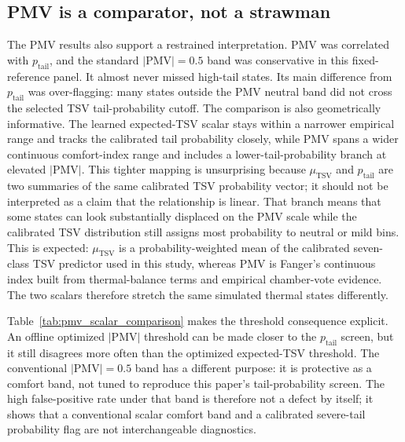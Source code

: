 \subsection{PMV is a comparator, not a strawman}

The PMV results also support a restrained interpretation. PMV was correlated with $p_{\mathrm{tail}}$, and the standard $|\mathrm{PMV}|=0.5$ band was conservative in this fixed-reference panel. It almost never missed high-tail states. Its main difference from $p_{\mathrm{tail}}$ was over-flagging: many states outside the PMV neutral band did not cross the selected TSV tail-probability cutoff. The comparison is also geometrically informative. The learned expected-TSV scalar stays within a narrower empirical range and tracks the calibrated tail probability closely, while PMV spans a wider continuous comfort-index range and includes a lower-tail-probability branch at elevated $|\mathrm{PMV}|$. This tighter mapping is unsurprising because $\mu_{\mathrm{TSV}}$ and $p_{\mathrm{tail}}$ are two summaries of the same calibrated TSV probability vector; it should not be interpreted as a claim that the relationship is linear. That branch means that some states can look substantially displaced on the PMV scale while the calibrated TSV distribution still assigns most probability to neutral or mild bins. This is expected: $\mu_{\mathrm{TSV}}$ is a probability-weighted mean of the calibrated seven-class TSV predictor used in this study, whereas PMV is Fanger's continuous index built from thermal-balance terms and empirical chamber-vote evidence. The two scalars therefore stretch the same simulated thermal states differently.

Table~\ref{tab:pmv_scalar_comparison} makes the threshold consequence explicit. An offline optimized $|\mathrm{PMV}|$ threshold can be made closer to the $p_{\mathrm{tail}}$ screen, but it still disagrees more often than the optimized expected-TSV threshold. The conventional $|\mathrm{PMV}|=0.5$ band has a different purpose: it is protective as a comfort band, not tuned to reproduce this paper's tail-probability screen. The high false-positive rate under that band is therefore not a defect by itself; it shows that a conventional scalar comfort band and a calibrated severe-tail probability flag are not interchangeable diagnostics.

